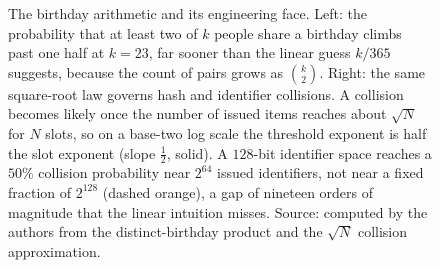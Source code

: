 \begin{figure}[htbp]
\begin{tikzpicture}[font=\small]
\end{tikzpicture}
\caption[Birthday coincidence and the collision threshold]{The birthday
arithmetic and its engineering face. Left: the probability that at least
two of $k$ people share a birthday climbs past one half at $k = 23$, far
sooner than the linear guess $k/365$ suggests, because the count of pairs
grows as $\binom{k}{2}$. Right: the same square-root law governs hash and
identifier collisions. A collision becomes likely once the number of
issued items reaches about $\sqrt{N}$ for $N$ slots, so on a base-two log
scale the threshold exponent is half the slot exponent (slope $\tfrac12$,
solid). A $128$-bit identifier space reaches a $50\%$ collision
probability near $2^{64}$ issued identifiers, not near a fixed fraction of
$2^{128}$ (dashed orange), a gap of nineteen orders of magnitude that the
linear intuition misses. Source: computed by the authors from the
distinct-birthday product and the $\sqrt{N}$ collision approximation.}
\label{fig:vol02:ch13:birthday-collision}
\end{figure}
